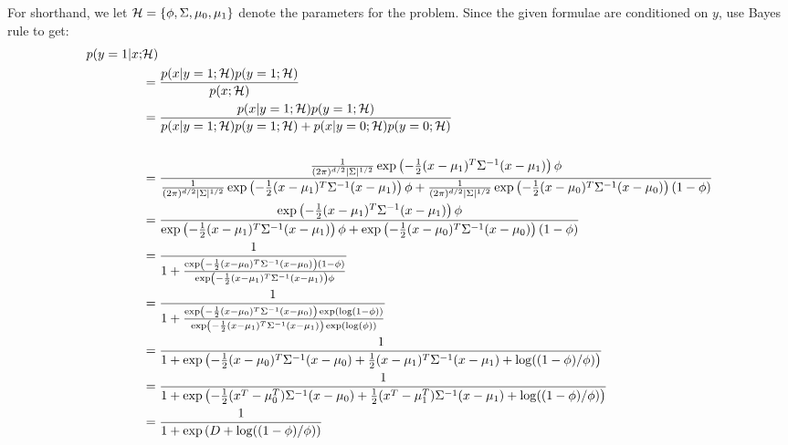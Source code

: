 For shorthand, we let $\mathcal{H} = \{\phi, \Sigma, \mu_{0}, \mu_1\}$ denote
the parameters for the problem.
Since the given formulae are conditioned on $y$, use Bayes rule to get:
\begin{align*}
	p(y =1| x ; & \mathcal{H})\\
	& = \frac {p(x|y=1; \mathcal{H}) p(y=1; \mathcal{H})} {p(x; \mathcal{H})}\\
	& = \frac {p(x|y=1; \mathcal{H}) p(y=1; \mathcal{H})}
		{p(x|y=1; \mathcal{H}) p(y=1; \mathcal{H}) + p(x|y={0}; \mathcal{H}) p(y={0};
		\mathcal{H})}\\\\
	&= \frac{\frac{1}{(2\pi)^{{d}/2} |\Sigma|^{1/2}}
		\exp\left(-\frac{1}{2}(x-\mu_1)^T \Sigma^{-1} (x-\mu_1) \right) \phi} 
		{
		\frac{1}{(2\pi)^{{d}/2} |\Sigma|^{1/2}}
		\exp\left(-\frac{1}{2}(x-\mu_1)^T \Sigma^{-1} (x-\mu_1) \right) \phi
		+ \frac{1}{(2\pi)^{{d}/2} |\Sigma|^{1/2}}
		\exp\left(-\frac{1}{2}(x-\mu_{0})^T \Sigma^{-1} (x-\mu_{0})\right) (1-\phi)
		} \\
	&=  \frac{
		\exp\left(-\frac{1}{2}(x-\mu_1)^T \Sigma^{-1} (x-\mu_1) \right) \phi} 
		{
		\exp\left(-\frac{1}{2}(x-\mu_1)^T \Sigma^{-1} (x-\mu_1) \right) \phi
		+ 
		\exp\left(-\frac{1}{2}(x-\mu_{0})^T \Sigma^{-1} (x-\mu_{0})\right) (1-\phi)
		} \\
	&= \frac{
		1} 
		{
		1
		+ 
		\frac{\exp\left(-\frac{1}{2}(x-\mu_{0})^T \Sigma^{-1} (x-\mu_{0})\right) (1-\phi)}{\exp\left(-\frac{1}{2}(x-\mu_1)^T \Sigma^{-1} (x-\mu_1) \right) \phi}
		}\\
	&= \frac{1} {1+ 
		\frac{\exp\left(-\frac{1}{2}(x-\mu_{0})^T \Sigma^{-1} (x-\mu_{0})\right) \exp(\log(1-\phi))}{\exp\left(-\frac{1}{2}(x-\mu_1)^T \Sigma^{-1} (x-\mu_1) \right) \exp(\log(\phi))}
		}\\
	&= \frac{1} {1+ 
		\exp\left(-\frac{1}{2}(x-\mu_{0})^T \Sigma^{-1} (x-\mu_{0})
		+ \frac{1}{2}(x-\mu_1)^T \Sigma^{-1} (x-\mu_1) +\log((1-\phi)/\phi)
		\right) 
		}\\
	&= \frac{1} {1+ 
		\exp\left(-\frac{1}{2}(x^T-\mu_{0}^T) \Sigma^{-1} (x-\mu_{0})
		+ \frac{1}{2}(x^T-\mu_1^T) \Sigma^{-1} (x-\mu_1) +\log((1-\phi)/\phi)
		\right) 
		}\\
	&= \frac{1} {1+ 
		\exp\left(D +\log((1-\phi)/\phi)
		\right) 
		}\\
\end{align*}


